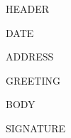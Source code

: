\documentclass[letterpaper,11pt]{article}
\begin{document}
{{HEADER}}

\vspace{1.2em}
{{DATE}}

\vspace{1em}
{{ADDRESS}}

\vspace{1em}
{{GREETING}}

{{BODY}}

\vspace{1em}
{{SIGNATURE}}
\end{document}
